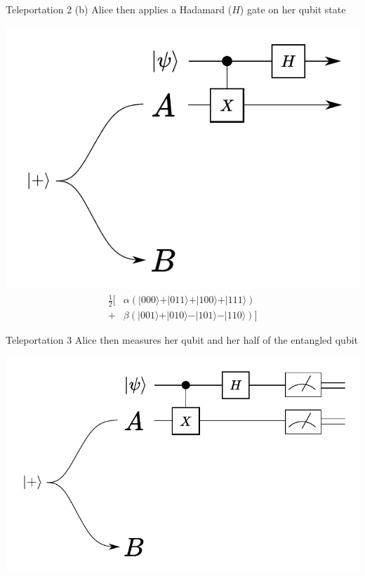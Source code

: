 \documentclass[11pt]{beamer}
\begin{document}
\begin{frame}{Teleportation 2 (b)}
Alice then applies a Hadamard ($H$) gate on her qubit state 

\vspace{0.5cm}

\begin{center}
\includegraphics[scale=0.6]{tele3.pdf}
\begin{align*}
\frac{1}{2}\big[& \alpha(\vert 000\rangle+\vert 011\rangle+\vert 100\rangle+\vert 111\rangle) \\
+& \beta (\vert 001\rangle + \vert 010\rangle-\vert 101\rangle - \vert 110\rangle) \big]
\end{align*}
\end{center}
\end{frame}

\begin{frame}{Teleportation 3}
Alice then measures her qubit and her half of the entangled qubit

\vspace{0.5cm}

\begin{center}
\includegraphics[scale=0.7]{tele4.pdf}

\end{center}
\end{frame}
\end{document}
